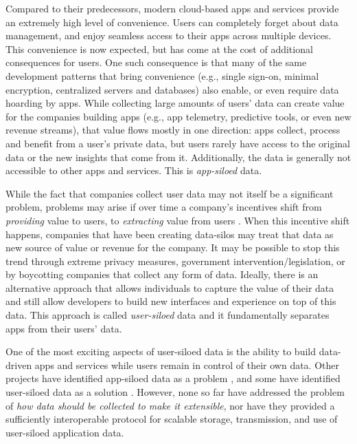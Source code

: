 \documentclass{textile}
\begin{document}
Compared to their predecessors, modern cloud-based apps and services provide an extremely high level of convenience. Users can completely forget about data management, and enjoy seamless access to their apps across multiple devices. This convenience is now expected, but has come at the cost of additional consequences for users. One such consequence is that many of the same development patterns that bring convenience (e.g., single sign-on, minimal encryption, centralized servers and databases) also enable, or even require data hoarding by apps. While collecting large amounts of users' data can create value for the companies building apps (e.g., app telemetry, predictive tools, or even new revenue streams), that value flows mostly in one direction: apps collect, process and benefit from a user's private data, but users rarely have access to the original data or the new insights that come from it. Additionally, the data is generally not accessible to other apps and services. This is \emph{app-siloed} data.

While the fact that companies collect user data may not itself be a significant problem, problems may arise if over time a company's incentives shift from \emph{providing} value to users, to \emph{extracting} value from users \cite{dixonWhyDecentralizationMatters2018}. When this incentive shift happens, companies that have been creating data-silos may treat that data as new source of value or revenue for the company. It may be possible to stop this trend through extreme privacy measures, government intervention/legislation, or by boycotting companies that collect any form of data. Ideally, there is an alternative approach that allows individuals to capture the value of their data and still allow developers to build new interfaces and experience on top of this data. This approach is called \emph{user-siloed} data and it fundamentally separates apps from their users' data.

One of the most exciting aspects of user-siloed data is the ability to build data-driven apps and services while users remain in control of their own data. Other projects have identified app-siloed data as a problem \cite{bernersLee_readwrite_2013,de_montjoye_trusted_2012}, and some have identified user-siloed data as a solution \cite{sambraSolidPlatformDecentralized2016}. However, none so far have addressed the problem of \emph{how data should be collected to make it extensible}, nor have they provided a sufficiently interoperable protocol for scalable storage, transmission, and use of user-siloed application data.
\end{document}
